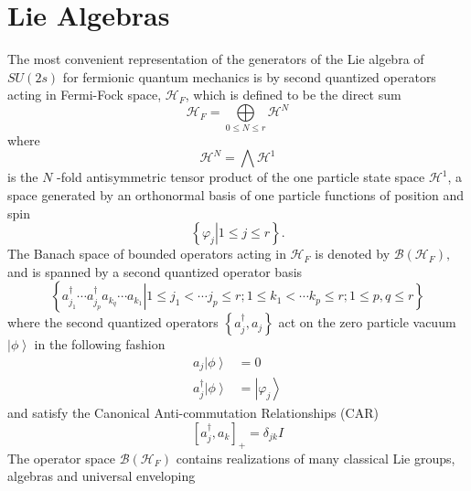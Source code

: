 \documentclass[aps,preprint]{revtex4}%
\begin{document}
\section{Lie Algebras\label{liealg}}

The most convenient representation of the generators of the Lie algebra of
$SU(2s)$ for fermionic quantum mechanics is by second quantized operators
acting in Fermi-Fock space, $\mathcal{H}_{F}$, which is defined to be the
direct sum
\begin{equation}
\mathcal{H}_{F}=%
{\textstyle\bigoplus\limits_{0\leq N\leq r}}
\mathcal{H}^{N}%
\end{equation}
where
\begin{equation}
\mathcal{H}^{N}=%
{\textstyle\bigwedge}
\mathcal{H}^{1}%
\end{equation}
is the $N$ -fold antisymmetric tensor product of the one particle state space
$\mathcal{H}^{1}$, a space generated by an orthonormal basis of one particle
functions of position and spin
\begin{equation}
\left\{  \left.  \varphi_{j}\right\vert 1\leq j\leq r\right\}  .
\end{equation}
The Banach space \cite{Encyclo} of bounded operators acting in $\mathcal{H}%
_{F}$ is denoted by $\mathcal{B}\left(  \mathcal{H}_{F}\right)  ,$ and is
spanned by a second quantized operator basis
\begin{equation}
\left\{  \left.  a_{j_{1}}^{\dagger}\cdots a_{j_{p}}^{\dagger}a_{k_{q}}\cdots
a_{k_{1}}\right\vert 1\leq j_{1}<\cdots j_{p}\leq r;1\leq k_{1}<\cdots
k_{p}\leq r;1\leq p,q\leq r\right\}
\end{equation}
where the second quantized operators $\left\{  a_{j}^{\dagger},a_{j}\right\}
$ act on the zero particle vacuum $\left\vert \phi\right\rangle $ in the
following fashion%
\begin{align}
a_{j}\left\vert \phi\right\rangle  &  =0\nonumber\\
a_{j}^{\dagger}\left\vert \phi\right\rangle  &  =\left\vert \varphi
_{j}\right\rangle
\end{align}
and satisfy the Canonical Anti-commutation Relationships (CAR)
\begin{equation}
\left[  a_{j}^{\dagger},a_{k}\right]  _{+}=\delta_{jk}I
\end{equation}
The operator space $\mathcal{B}\left(  \mathcal{H}_{F}\right)  $ contains
realizations of many classical Lie groups, algebras and universal enveloping
\end{document}
